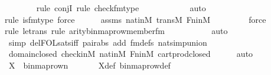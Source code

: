 \begin{isabellebody}
\ \ \ \ \ \ \ \isamarkupfalse%
{\isacharparenleft}{\kern0pt}rule\ conjI{\isacharcomma}{\kern0pt}\ rule\ check{\isacharunderscore}{\kern0pt}fm{\isacharunderscore}{\kern0pt}type{\isacharparenright}{\kern0pt}\isanewline
\ \ \ \ \ \ \ \ \ \ \isamarkupfalse%
\ auto{\isacharbrackleft}{\kern0pt}{}{\isacharbrackright}{\kern0pt}\isanewline
\ \ \ \ \ \ \ \isamarkupfalse%
{\isacharparenleft}{\kern0pt}rule\ is{\isacharunderscore}{\kern0pt}{}{\isacharunderscore}{\kern0pt}fm{\isacharunderscore}{\kern0pt}type{\isacharcomma}{\kern0pt}\ force{\isacharparenright}{\kern0pt}\isanewline
\ \ \ \ \isamarkupfalse%
\ assms\ nat{\isacharunderscore}{\kern0pt}in{\isacharunderscore}{\kern0pt}M\ transM\ Fn{\isacharunderscore}{\kern0pt}in{\isacharunderscore}{\kern0pt}M\ \isanewline
\ \ \ \ \ \ \isamarkupfalse%
\ force\ \isanewline
\ \ \ \ \ \isamarkupfalse%
{\isacharparenleft}{\kern0pt}rule\ le{\isacharunderscore}{\kern0pt}trans{\isacharcomma}{\kern0pt}\ rule\ arity{\isacharunderscore}{\kern0pt}binmap{\isacharunderscore}{\kern0pt}row{\isacharprime}{\kern0pt}{\isacharunderscore}{\kern0pt}member{\isacharunderscore}{\kern0pt}fm{\isacharparenright}{\kern0pt}\isanewline
\ \ \ \ \ \ \ \ \ \isamarkupfalse%
\ auto{\isacharbrackleft}{\kern0pt}{}{\isacharbrackright}{\kern0pt}\isanewline
\ \ \ \ \ \isamarkupfalse%
\ {\isacharparenleft}{\kern0pt}simp\ del{\isacharcolon}{\kern0pt}FOL{\isacharunderscore}{\kern0pt}sats{\isacharunderscore}{\kern0pt}iff\ pair{\isacharunderscore}{\kern0pt}abs\ add{\isacharcolon}{\kern0pt}\ fm{\isacharunderscore}{\kern0pt}defs\ nat{\isacharunderscore}{\kern0pt}simp{\isacharunderscore}{\kern0pt}union{\isacharparenright}{\kern0pt}\isanewline
\ \ \ \ \isamarkupfalse%
\ domain{\isacharunderscore}{\kern0pt}closed\ check{\isacharunderscore}{\kern0pt}in{\isacharunderscore}{\kern0pt}M\ nat{\isacharunderscore}{\kern0pt}in{\isacharunderscore}{\kern0pt}M\ Fn{\isacharunderscore}{\kern0pt}in{\isacharunderscore}{\kern0pt}M\ cartprod{\isacharunderscore}{\kern0pt}closed\isanewline
\ \ \ \ \isamarkupfalse%
\ auto\isanewline
\isanewline
\ \ \isamarkupfalse%
\ {\isachardoublequoteopen}X\ {\isacharequal}{\kern0pt}\ binmap{\isacharunderscore}{\kern0pt}row{\isacharprime}{\kern0pt}{\isacharparenleft}{\kern0pt}n{\isacharparenright}{\kern0pt}{\isachardoublequoteclose}\ \isanewline
\ \ \ \ \isamarkupfalse%
\ X{\isacharunderscore}{\kern0pt}def\ binmap{\isacharunderscore}{\kern0pt}row{\isacharprime}{\kern0pt}{\isacharunderscore}{\kern0pt}def\ \isanewline

\end{isabellebody}

